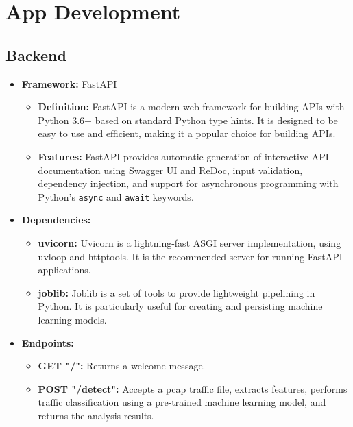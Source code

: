 \chapter{App Development}

\thispagestyle{empty}



\section{Backend}
\begin{itemize}
	\item \textbf{Framework:} FastAPI
	\begin{itemize}
		\item \textbf{Definition:} FastAPI is a modern web framework for building APIs with Python 3.6+ based on standard Python type hints. It is designed to be easy to use and efficient, making it a popular choice for building APIs.
		\item \textbf{Features:} FastAPI provides automatic generation of interactive API documentation using Swagger UI and ReDoc, input validation, dependency injection, and support for asynchronous programming with Python's \texttt{async} and \texttt{await} keywords.
	\end{itemize}
	\item \textbf{Dependencies:}
	\begin{itemize}
		\item \textbf{uvicorn:} Uvicorn is a lightning-fast ASGI server implementation, using uvloop and httptools. It is the recommended server for running FastAPI applications.
		\item \textbf{joblib:} Joblib is a set of tools to provide lightweight pipelining in Python. It is particularly useful for creating and persisting machine learning models.
	\end{itemize}
	\item \textbf{Endpoints:}
	\begin{itemize}
		\item \textbf{GET "/":} Returns a welcome message.
		\item \textbf{POST "/detect":} Accepts a pcap traffic file, extracts features, performs traffic classification using a pre-trained machine learning model, and returns the analysis results.
	\end{itemize}
\end{itemize}

